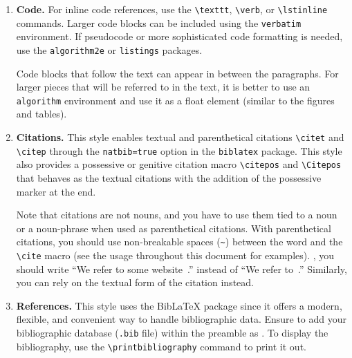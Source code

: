 \documentclass[fullpaper]{nldl}
\begin{document}
\begin{enumerate}[leftmargin=*]
Variables in mathematical expressions should ideally be represented by a single letter, both for subscripts and superscripts.
In cases where more context or clarity is required by including words or multiple letters, you should escape the word using \verb|\mathit|, \verb|\text|, or \verb|\mathrm|.
For example:
\begin{equation}
  \mathbf{w}^{\text{(new)}} = \mathbf{w}^{\text{(old)}} - \alpha \frac{\partial \mathcal{L}(\mathbf{w}^{\text{(old)}})}{\partial \mathbf{w}}.
\end{equation}
But you should prefer to use $\mathbf{w}^{t}$ instead of the word based superscripts.
The mathematics in the manuscript should flow within the language and should not appear as standalone pieces.
You are recommended to review the work of \citet{Knuth1989}.

\item \textbf{Code.}
For inline code references, use the \verb|\texttt|, \verb|\verb|, or \verb|\lstinline| commands.
Larger code blocks can be included using the \verb|verbatim| environment.
If pseudocode or more sophisticated code formatting is needed, use the \verb|algorithm2e| or \verb|listings| packages.

Code blocks that follow the text can appear in between the paragraphs.
For larger pieces that will be referred to in the text, it is better to use an \verb|algorithm| environment and use it as a float element (similar to the figures and tables).

\item \textbf{Citations.}
This style enables textual and parenthetical citations \verb|\citet| and \verb|\citep| through the \verb|natbib=true| option in the \verb|biblatex| package.
This style also provides a possessive or genitive citation macro \verb|\citepos| and \verb|\Citepos| that behaves as the textual citations with the addition of the possessive marker at the end.

Note that citations are not nouns, and you have to use them tied to a noun or a noun-phrase when used as parenthetical citations.
With parenthetical citations, you should use non-breakable spaces (\verb|~|) between the word and the \verb|\cite| macro (see the usage throughout this document for examples).
\Eg, you should write ``We refer to some website~\citep{tromso}.''  instead of ``We refer to~\citep{tromso}.''
Similarly, you can rely on the textual form of the citation instead.

\item \textbf{References.}
This style uses the BibLaTeX package since it offers a modern, flexible, and convenient way to handle bibliographic data.
Ensure to add your bibliographic database (\verb|.bib| file) within the preamble as \verb||.
To display the bibliography, use the \verb|\printbibliography| command to print it out.


\end{enumerate}
\end{document}
